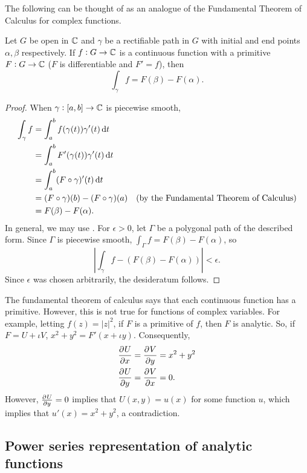	The following can be thought of as an analogue of the Fundamental Theorem of Calculus for complex functions.

	\begin{ftheo}
		\label{theo: ftc-like}
		Let $G$ be open in $\mathbb{C}$ and $\gamma$ be a rectifiable path in $G$ with initial and end points $\alpha,\beta$ respectively. If $f : G \to \mathbb{C}$ is a continuous function with a primitive $F : G \to \mathbb{C}$ ($F$ is differentiable and $F' = f$), then
		\[ \int_\gamma f = F(\beta) - F(\alpha). \]
	\end{ftheo}
	\begin{proof}
		When $\gamma : [a,b] \to \mathbb{C}$ is piecewise smooth,
		\begin{align*}
			\int_\gamma f &= \int_a^b f(\gamma(t)) \gamma'(t) \dif t \\
				&= \int_a^b F'(\gamma(t)) \gamma'(t) \dif t \\
				&= \int_a^b (F \circ \gamma)'(t) \dif t \\
				&= (F \circ \gamma) (b) - (F \circ \gamma) (a) & \text{(by the Fundamental Theorem of Calculus)} \\
				&= F(\beta) - F(\alpha).
		\end{align*}
		In general, we may use . For $\epsilon > 0$, let $\Gamma$ be a polygonal path of the described form. Since $\Gamma$ is piecewise smooth, $\int_\Gamma f = F(\beta) - F(\alpha)$, so
		\[ \left| \int_\gamma f - (F(\beta) - F(\alpha)) \right| < \epsilon. \]
		Since $\epsilon$ was chosen arbitrarily, the desideratum follows.
	\end{proof}

	The fundamental theorem of calculus says that each continuous function has a primitive. However, this is not true for functions of complex variables. For example, letting $f(z) = |z|^2$, if $F$ is a primitive of $f$, then $F$ is analytic. So, if $F = U + \iota V$, $x^2 + y^2 = F'(x+\iota y)$. Consequently,
	\begin{align*}
		\dpd{U}{x} &= \dpd{V}{y} = x^2 + y^2 \\
		\dpd{U}{y} &= \dpd{V}{x} = 0.
	\end{align*}
	However, $\pd{U}{y} = 0$ implies that $U(x,y) = u(x)$ for some function $u$, which implies that $u'(x) = x^2 + y^2$, a contradiction.

\subsection{Power series representation of analytic functions}

